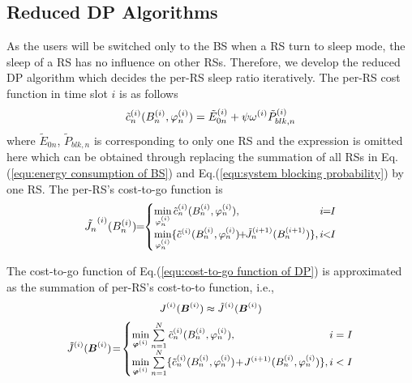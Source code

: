 \documentclass[conference]{IEEEtran}
\begin{document}
 \subsection{Reduced DP Algorithms}
 As the users will be switched only to the BS when a RS turn to sleep mode, the sleep of a RS has no influence on other RSs. Therefore, we develop the reduced DP algorithm which decides the per-RS sleep ratio iteratively.
 The per-RS cost function in time slot $i$ is as follows
 \begin{equation}\label{equ:cost function per-RS}
  \small{\tilde{c}_n^{(i)}(B_n^{(i)},\varphi_n^{(i)}) = \tilde{E}_{0n}^{(i)}+\psi\omega^{(i)}\tilde{P}_{blk,n}^{(i)}}
 \end{equation}
 where $\tilde{E}_{0n}$, $\tilde{P}_{blk,n}$ is corresponding to only one RS and the expression is omitted here which can be obtained through replacing the summation of all RSs in Eq.(\ref{equ:energy consumption of BS}) and Eq.(\ref{equ:system blocking probability}) by one RS.
 The per-RS's cost-to-go function is
 \begin{equation}\label{equ:cost-to-go function per-RS}
  \small{\tilde{J_n}^{(i)}(B_n^{(i)})\!\!=\!\! \begin{cases}\min\limits_{\varphi_n^{(i)}}\tilde{c}_n^{(i)}(B_n^{(i)},\varphi_n^{(i)}),\!&\!\!\!\!{i\!\!=\!\!I}\\ \min\limits_{\varphi_n^{(i)}}\{\tilde{c}^{(i)}(B_n^{(i)},\varphi_n^{(i)})\!\!+\!\!\tilde{J}_n^{(i+1)}(B_n^{(i+1)})\},\!&\!\!\!\!{i\!\!<\!\!I}
   \end{cases}}
 \end{equation}

 The cost-to-go function of Eq.(\ref{equ:cost-to-go function of DP}) is approximated as the summation of per-RS's cost-to-to function, i.e.,
 \begin{equation}\label{equ:approximation}
  \small{J^{(i)}(\boldsymbol{B}^{(i)}) \approx  \tilde{J}^{(i)}(\boldsymbol{B}^{(i)})}
 \end{equation}
 \begin{equation}\label{equ:cost-to-go function of reduced DP}
  \small{\tilde{J}^{(i)}(\boldsymbol{B}^{(i)})\!=\!\begin{cases}\min\limits_{\boldsymbol{\varphi}^{(i)}}\sum\limits_{n=1}^N\tilde{c}_n^{(i)}(B_n^{(i)},\varphi_n^{(i)}),\!\!\!&\!\!{i=I}\\ \min\limits_{\boldsymbol{\varphi}^{(i)}}\sum\limits_{n=1}^N\{\tilde{c}_n^{(i)}(B_n^{(i)},\varphi_n^{(i)})\!+\!J^{(i+1)}(B_n^{(i)},\varphi_n^{(i)})\},\!\!\!&\!\!{i<I}
   \end{cases}}
 \end{equation}
\end{document}
